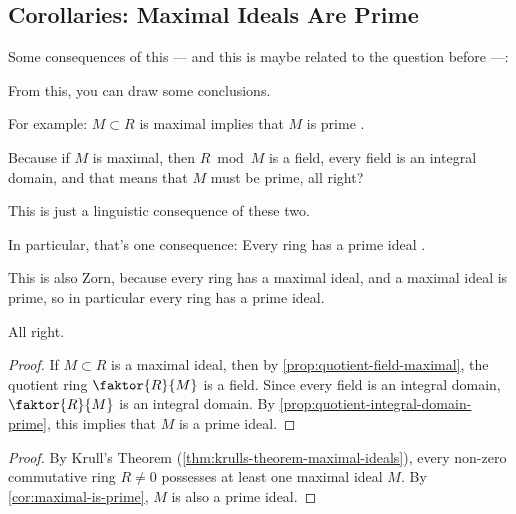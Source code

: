 \subsection{Corollaries: Maximal Ideals Are Prime}

\begin{speech}[01:02:08 - 01:03:02]
Some consequences of this --- and this is maybe related to the question before ---:

From this, you can draw some conclusions.

For example: $M \subset R$ is maximal implies that $M$ is prime .

Because if $M$ is maximal, then $R \bmod M$ is a field, every field is an integral domain, and that means that $M$ must be prime, all right?

This is just a linguistic consequence of these two.

In particular, that's one consequence: Every ring has a prime ideal .

This is also Zorn, because every ring has a maximal ideal, and a maximal ideal is prime, so in particular every ring has a prime ideal.

All right.
\end{speech}

\begin{content}

\begin{proof}
If $M \subset R$ is a maximal ideal, then by \cref{prop:quotient-field-maximal}, the quotient ring $\faktor{R}{M}$ is a field. Since every field is an integral domain, $\faktor{R}{M}$ is an integral domain. By \cref{prop:quotient-integral-domain-prime}, this implies that $M$ is a prime ideal.
\end{proof}


\begin{proof}
By Krull's Theorem (\cref{thm:krulls-theorem-maximal-ideals}), every non-zero commutative ring $R \neq 0$ possesses at least one maximal ideal $M$. By \cref{cor:maximal-is-prime}, $M$ is also a prime ideal.
\end{proof}
\end{content}

